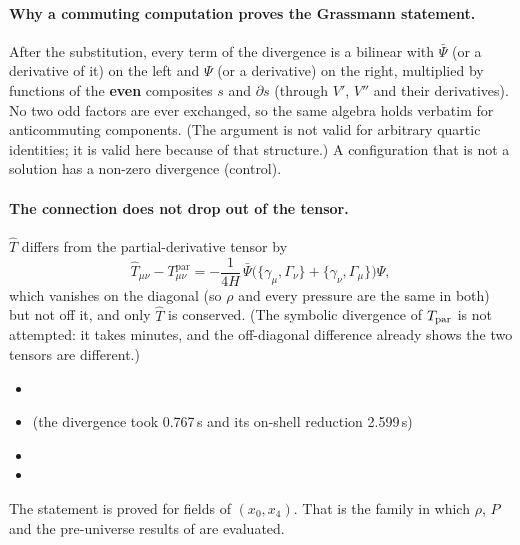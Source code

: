 \paragraph{Why a commuting computation proves the Grassmann statement.} After the substitution,
every term of the divergence is a bilinear with $\bar\Psi$ (or a derivative of it) on the left and
$\Psi$ (or a derivative) on the right, multiplied by functions of the \textbf{even} composites $s$ and
$\partial s$ (through $V'$, $V''$ and their derivatives). No two odd factors are ever exchanged, so
the same algebra holds verbatim for anticommuting components. (The argument is not valid for
arbitrary quartic identities; it is valid here because of that structure.) A configuration that is
not a solution has a non-zero divergence (control).

\paragraph{The connection does not drop out of the tensor.} $\hat T$ differs from the
partial-derivative tensor by
\[
  \hat T_{\mu\nu}-T^{\mathrm{par}}_{\mu\nu}=-\frac{1}{4H}\,\bar\Psi\bigl(\{\gamma_\mu,\Gamma_\nu\}+\{\gamma_\nu,\Gamma_\mu\}\bigr)\Psi ,
\]
which vanishes on the diagonal (so $\rho$ and every pressure are the same in both) but not off it,
and only $\hat T$ is conserved. (The symbolic divergence of $T_{\mathrm{par}}$ is not attempted: it takes
minutes, and the off-diagonal difference already shows the two tensors are different.)
\begin{itemize}
  \item {}
  \item {} (the divergence took 0.767\,s and its on-shell
        reduction 2.599\,s)
  \item {}
  \item {}
\end{itemize}
The statement is proved for fields of $(x_0,x_4)$. That is the family in which $\rho$, $P$ and the
pre-universe results of  are evaluated.

